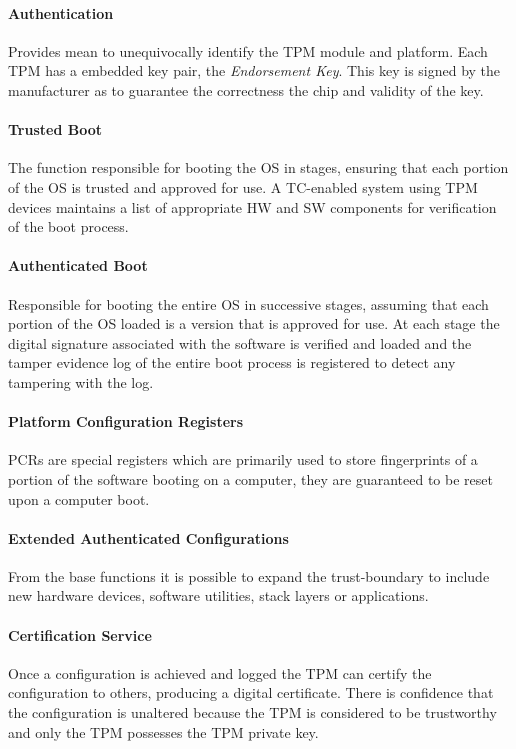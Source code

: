 \paragraph{Authentication}
Provides mean to unequivocally identify the TPM module and platform.
Each TPM has a embedded key pair, the \textit{Endorsement Key}.
This key is signed by the manufacturer as to guarantee the correctness the chip and validity of the key.

\paragraph{Trusted Boot}
The function responsible for booting the OS in stages,
ensuring that each portion of the OS is trusted and approved for use.
A TC-enabled system using TPM devices maintains a list of appropriate HW and SW components for verification of the boot process.

\paragraph{Authenticated Boot}
Responsible for booting the entire OS in successive stages,
assuming that each portion of the OS loaded is a version that is approved for use.
At each stage the digital signature associated with the software is verified and loaded and
the tamper evidence log of the entire boot process is registered to detect any tampering with the log.

\paragraph{Platform Configuration Registers}
PCRs are special registers which are primarily used to store fingerprints of a portion of the software booting on a computer,
they are guaranteed to be reset upon a computer boot.

\paragraph{Extended Authenticated Configurations}
From the base functions it is possible to expand the trust-boundary to include new hardware devices,
software utilities, stack layers or applications.

\paragraph{Certification Service}
Once a configuration is achieved and logged the TPM can certify the configuration to others, producing a digital certificate.
There is confidence that the configuration is unaltered because the TPM is considered to be trustworthy and only the TPM possesses the TPM private key.

